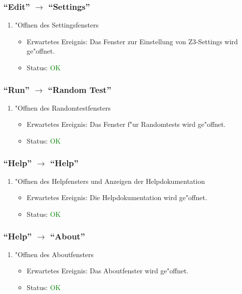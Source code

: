 \subsubsection{"`Edit"' $\rightarrow$ "`Settings"'}
\begin{enumerate}
\item "Offnen des Settingsfensters
\begin{itemize}
\item Erwartetes Ereignis: Das Fenster zur Einstellung von Z3-Settings wird ge"offnet. 
\item Status: \textcolor{green}{OK}
\end{itemize}
\end{enumerate}
\subsubsection{"`Run"' $\rightarrow$ "`Random Test"'}
\begin{enumerate}
\item "Offnen des Randomtestfensters
\begin{itemize}
\item Erwartetes Ereignis: Das Fenster f"ur Randomtests wird ge"offnet. 
\item Status: \textcolor{green}{OK}
\end{itemize}
\end{enumerate}
\subsubsection{"`Help"' $\rightarrow$ "`Help"'}
\begin{enumerate}
\item "Offnen des Helpfensters und Anzeigen der Helpdokumentation
\begin{itemize}
\item Erwartetes Ereignis: Die Helpdokumentation wird ge"offnet. 
\item Status: \textcolor{green}{OK}
\end{itemize}
\end{enumerate}
\subsubsection{"`Help"' $\rightarrow$ "`About"'}
\begin{enumerate}
\item "Offnen des Aboutfensters
\begin{itemize}
\item Erwartetes Ereignis: Das Aboutfenster wird ge"offnet. 
\item Status: \textcolor{green}{OK}
\end{itemize}
\end{enumerate}

